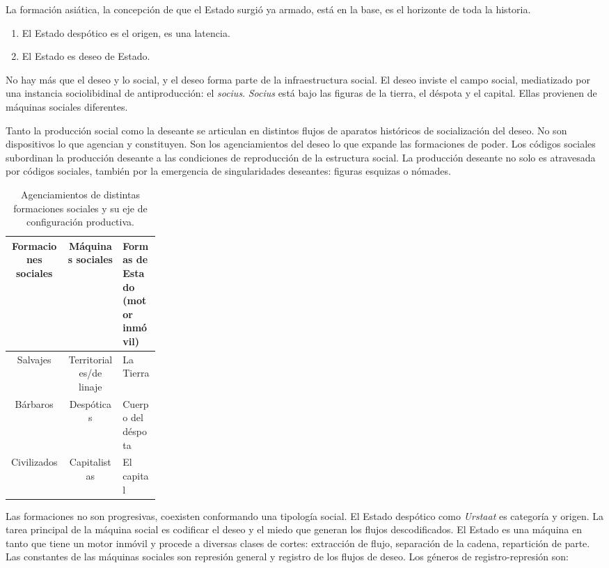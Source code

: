 La formación asiática, la concepción de que el Estado surgió ya armado, está en la base, es el horizonte de toda la historia.

\begin{enumerate}[labelindent=\parindent, leftmargin=*, label=\roman*., widest=ii, align=left]
  \item El Estado despótico es el origen, es una latencia.
  \item El Estado es deseo de Estado.
\end{enumerate}

No hay más que el deseo y lo social, y el deseo forma parte de la infraestructura social. El deseo inviste el campo social, mediatizado por una instancia sociolibidinal de antiproducción: el \emph{socius}. \emph{Socius} está bajo las figuras de la tierra, el déspota y el capital. Ellas provienen de máquinas sociales diferentes.

Tanto la producción social como la deseante se articulan en distintos flujos de aparatos históricos de socialización del deseo. No son dispositivos lo que agencian y constituyen. Son los agenciamientos del deseo lo que expande las formaciones de poder. Los códigos sociales subordinan la producción deseante a las condiciones de reproducción de la estructura social. La producción deseante no solo es atravesada por códigos sociales, también por la emergencia de singularidades deseantes: figuras esquizas o nómades.

\begin{table}[htb]
  \caption{Agenciamientos de distintas formaciones sociales y su eje de configuración productiva.} %
  \label{tab:tablename}
  \centering
  \begin{tabular}{ccp{0.25\linewidth}}
    \toprule
    \textbf{Formaciones sociales} & \textbf{Máquinas sociales} & \textbf{Formas de Estado (motor inmóvil)}\\
    \midrule
    Salvajes & Territoriales/de linaje & La Tierra\\
    Bárbaros & Despóticas & Cuerpo del déspota\\
    Civilizados & Capitalistas & El capital\\
    \bottomrule
  \end{tabular}
\end{table}

Las formaciones no son progresivas, coexisten conformando una tipología social. El Estado despótico como \emph{Urstaat} es categoría y origen. La tarea principal de la máquina social es codificar el deseo y el miedo que generan los flujos descodificados. El Estado es una máquina en tanto que tiene un motor inmóvil y procede a diversas clases de cortes: extracción de flujo, separación de la cadena, repartición de parte. Las constantes de las máquinas sociales son represión general y registro de los flujos de deseo. Los géneros de registro-represión son:

